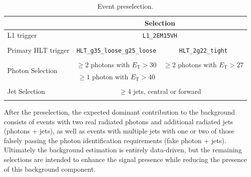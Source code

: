 \begin{table}[htbp]
  \begin{center}
  \caption{Event preselection.}
  \label{tab:HBSM:preselection}
    {\footnotesize
  \begin{tabular}{ l c c}
    \toprule
    & \multicolumn{2}{c}{Selection} \\
    \midrule
    L1 trigger  & \multicolumn{2}{c}{\texttt{L1\_2EM15VH}} \\
    \\
    Primary HLT trigger  & \texttt{HLT\_g35\_loose\_g25\_loose} & \texttt{HLT\_2g22\_tight} \\
    \\ 
    \multirow{2}{*}{Photon Selection} & $\geq 2$ photons with $E_\text{T}>30$ \GeV{} & $\geq 2$ photons with $E_\text{T}>27$ \GeV{}\\ 
                                      & $\geq 1$ photon with $E_\text{T}>40$ \GeV{}\\
    \\
    Jet Selection & \multicolumn{2}{c}{$\geq 4$ jets, central or forward} \\
    \\
    \bottomrule
  \end{tabular}
    }
  \end{center}
\end{table}

After the preselection, the expected dominant contribution to the background consists of events with two real radiated photons and additional radiated jets (photons + jets), as well as events with multiple jets with one or two of those falsely passing the photon identification requirements (fake photon + jets).
Ultimately the background estimation is entirely data-driven, but the remaining selections are intended to enhance the signal presence while reducing the presence of this background component.

